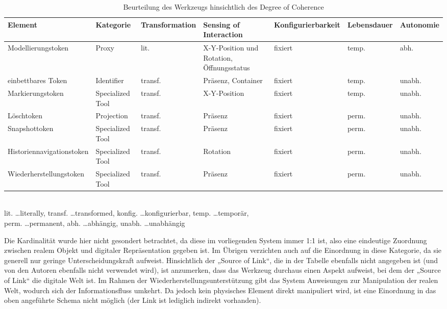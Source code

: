 \begin{table}[htbp]
	\centering
	\caption{Beurteilung des Werkzeugs hinsichtlich des Degree of Coherence}
	\begin{tabular}{| p{2cm} || p{2cm} | p{} | p{} | p{} | p{} | p{} |} \hline
		Element & Kategorie & Trans\-for\-mation & Sensing of Inter\-action & Konfig\-urierbar\-keit & Lebens\-dauer & Auto\-nomie \\ \hline \hline
		Modell\-ierungs\-token  & Proxy & lit. & X-Y-Position und Rotation, Öffnungsstatus & fixiert & temp. & abh. \\ \hline
		einbett\-bares Token & Identifier & transf. & Präsenz, Container & fixiert & temp. & unabh. \\ \hline
		Mark\-ierungs\-token & Specialized Tool & transf. & X-Y-Position & fixiert & temp. & unabh. \\ \hline
		Löschtoken & Projection & transf. & Präsenz & fixiert & perm. & unabh. \\ \hline
		Snapshot\-token & Specialized Tool & transf. & Präsenz & fixiert & perm. & unabh. \\ \hline
		Historien\-navigations\-token & Specialized Tool & transf. & Rotation & fixiert & perm. & unabh. \\ \hline
		Wieder\-herstellungs\-token & Specialized Tool & transf. & Präsenz & fixiert & perm. & unabh. \\ \hline
	\end{tabular} \\
	\footnotesize lit. \ldots literally, transf. \ldots transformed, konfig. \ldots konfigurierbar, temp. \ldots temporär,\\ perm. \ldots permanent, abh. \ldots abhängig, unabh. \ldots unabhängig
	\label{tab:degree_of_coherence}
\end{table}

Die Kardinalität wurde hier nicht gesondert betrachtet, da diese im vorliegenden System immer 1:1 ist, also eine eindeutige Zuordnung zwischen realem Objekt und digitaler Repräsentation gegeben ist. Im Übrigen verzichten auch \citet{Koleva03} auf die Einordnung in diese Kategorie, da sie generell nur geringe Unterscheidungskraft aufweist. Hinsichtlich der „Source of Link“, die in der Tabelle ebenfalls nicht angegeben ist (und von den Autoren ebenfalls nicht verwendet wird), ist anzumerken, dass das Werkzeug durchaus einen Aspekt aufweist, bei dem der „Source of Link“ die digitale Welt ist. Im Rahmen der Wiederherstellungsunterstützung gibt das System Anweisungen zur Manipulation der realen Welt, wodurch sich der Informationsfluss umkehrt. Da jedoch kein physisches Element direkt manipuliert wird, ist eine Einordnung in das oben angeführte Schema nicht möglich (der Link ist lediglich indirekt vorhanden).

